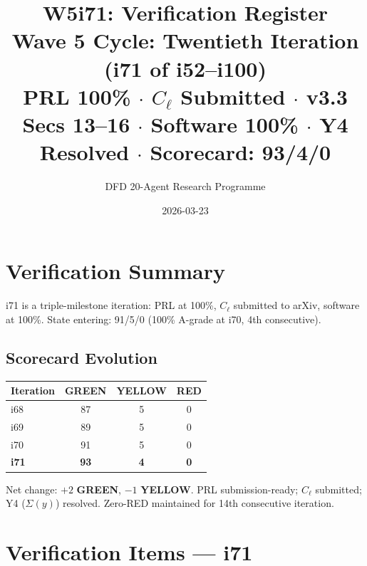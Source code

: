 \documentclass[11pt,a4paper]{article}
\title{\Large W5i71: Verification Register\\[6pt]
\normalsize Wave 5 Cycle: Twentieth Iteration (i71 of i52--i100)\\[6pt]
PRL 100\% $\cdot$ $C_\ell$ Submitted $\cdot$ v3.3 Secs 13--16 $\cdot$ Software 100\% $\cdot$ Y4 Resolved $\cdot$ Scorecard: 93/4/0}
\author{DFD 20-Agent Research Programme}
\date{2026-03-23}
\newcommand{\GREEN}{\textcolor{dfdgreen}{\textbf{GREEN}}}
\newcommand{\YELLOW}{\textcolor{dfdyellow}{\textbf{YELLOW}}}
\begin{document}
\maketitle

\section{Verification Summary}

i71 is a triple-milestone iteration: PRL at 100\%, $C_\ell$ submitted to arXiv, software at 100\%. State entering: 91/5/0 (100\% A-grade at i70, 4th consecutive).

\subsection{Scorecard Evolution}

\begin{center}
\begin{tabular}{lccc}
\toprule
\textbf{Iteration} & \textbf{GREEN} & \textbf{YELLOW} & \textbf{RED} \\
\midrule
i68 & 87 & 5 & 0 \\
i69 & 89 & 5 & 0 \\
i70 & 91 & 5 & 0 \\
\textbf{i71} & \textbf{93} & \textbf{4} & \textbf{0} \\
\bottomrule
\end{tabular}
\end{center}

Net change: $+2$ \GREEN, $-1$ \YELLOW. PRL submission-ready; $C_\ell$ submitted; Y4 ($\Sigma(y)$) resolved. Zero-RED maintained for 14th consecutive iteration.

\section{Verification Items --- i71}
\end{document}
